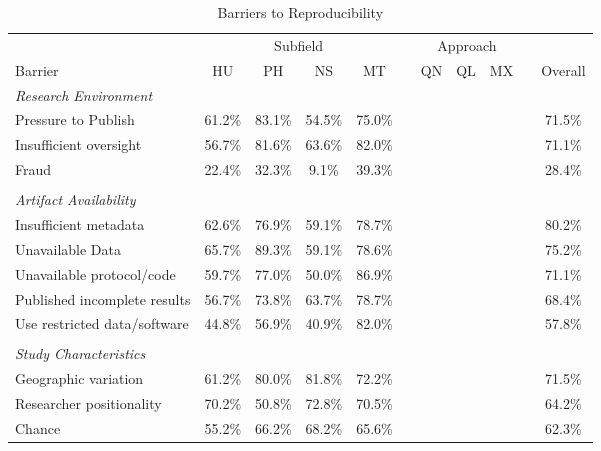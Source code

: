 \documentclass[]{interact}
\theoremstyle{plain}%
\theoremstyle{definition}
\theoremstyle{remark}
\begin{document}
\begin{table}[h]
    \centering
    \begin{threeparttable}
    \caption{Barriers to Reproducibility}
    \begin{tabular}{l c c c c c c c c c c}
         \hline
                    & \multicolumn{4}{1}{Subfield}  & & \multicolumn{3}{1}{Approach} & & \\
         Barrier    & HU & PH & NS & MT            & & QN & QL & MX              & & Overall \\
         \hline
         \textit{Research Environment}      & & & & & & & & & & \\
         Pressure to Publish                & 61.2\% & 83.1\% & 54.5\% & 75.0\% & & & & & & 71.5\% \\
         Insufficient oversight             & 56.7\% & 81.6\% & 63.6\% & 82.0\% & & & & & & 71.1\% \\
         Fraud                              & 22.4\% & 32.3\% & 9.1\%  & 39.3\% & & & & & & 28.4\% \\
                                            & & & & & & & & & &\\
         \textit{Artifact Availability}     & & & & & & & & & & \\
         Insufficient metadata              & 62.6\% & 76.9\% & 59.1\% & 78.7\% & & & & & & 80.2\% \\
         Unavailable Data                   & 65.7\% & 89.3\% & 59.1\% & 78.6\% & & & & & & 75.2\% \\
         Unavailable protocol/code          & 59.7\% & 77.0\% & 50.0\% & 86.9\% & & & & & & 71.1\% \\
         Published incomplete results       & 56.7\% & 73.8\% & 63.7\% & 78.7\% & & & & & & 68.4\% \\
         Use restricted data/software       & 44.8\% & 56.9\% & 40.9\% & 82.0\% & & & & & & 57.8\% \\
                                            & & & & & & & & & &\\
         \textit{Study Characteristics}     & & & & & & & & & & \\
         Geographic variation               & 61.2\% & 80.0\% & 81.8\% & 72.2\% & & & & & & 71.5\% \\
         Researcher positionality           & 70.2\% & 50.8\% & 72.8\% & 70.5\% & & & & & & 64.2\% \\
         Chance                             & 55.2\% & 66.2\% & 68.2\% & 65.6\% & & & & & & 62.3\% \\

\end{tabular}
\end{threeparttable}
\end{table}
\end{document}

